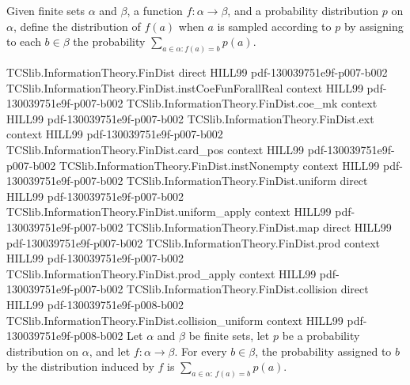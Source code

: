 \begin{definition}
\label{TCSlib.InformationTheory.FinDist.map}
\leanok
{}
Given finite sets $\alpha$ and $\beta$, a function $f:\alpha\to\beta$, and a probability
distribution $p$ on $\alpha$, define the distribution of $f(a)$ when $a$ is sampled
according to $p$ by assigning to each $b\in\beta$ the probability
$\sum_{a\in\alpha:f(a)=b}p(a)$.
\end{definition}

\begin{theorem}
\label{TCSlib.InformationTheory.FinDist.map_apply}
\leanok
\proofstep
  {TCSlib.InformationTheory.FinDist}
  {direct}
  {HILL99}
  {pdf-130039751e9f-p007-b002}
\proofstep
  {TCSlib.InformationTheory.FinDist.instCoeFunForallReal}
  {context}
  {HILL99}
  {pdf-130039751e9f-p007-b002}
\proofstep
  {TCSlib.InformationTheory.FinDist.coe_mk}
  {context}
  {HILL99}
  {pdf-130039751e9f-p007-b002}
\proofstep
  {TCSlib.InformationTheory.FinDist.ext}
  {context}
  {HILL99}
  {pdf-130039751e9f-p007-b002}
\proofstep
  {TCSlib.InformationTheory.FinDist.card_pos}
  {context}
  {HILL99}
  {pdf-130039751e9f-p007-b002}
\proofstep
  {TCSlib.InformationTheory.FinDist.instNonempty}
  {context}
  {HILL99}
  {pdf-130039751e9f-p007-b002}
\proofstep
  {TCSlib.InformationTheory.FinDist.uniform}
  {direct}
  {HILL99}
  {pdf-130039751e9f-p007-b002}
\proofstep
  {TCSlib.InformationTheory.FinDist.uniform_apply}
  {context}
  {HILL99}
  {pdf-130039751e9f-p007-b002}
\proofstep
  {TCSlib.InformationTheory.FinDist.map}
  {direct}
  {HILL99}
  {pdf-130039751e9f-p007-b002}
\proofstep
  {TCSlib.InformationTheory.FinDist.prod}
  {context}
  {HILL99}
  {pdf-130039751e9f-p007-b002}
\proofstep
  {TCSlib.InformationTheory.FinDist.prod_apply}
  {context}
  {HILL99}
  {pdf-130039751e9f-p007-b002}
\proofstep
  {TCSlib.InformationTheory.FinDist.collision}
  {direct}
  {HILL99}
  {pdf-130039751e9f-p008-b002}
\proofstep
  {TCSlib.InformationTheory.FinDist.collision_uniform}
  {context}
  {HILL99}
  {pdf-130039751e9f-p008-b002}
Let $\alpha$ and $\beta$ be finite sets, let $p$ be a probability distribution on
$\alpha$, and let $f\colon\alpha\to\beta$. For every $b\in\beta$, the probability
assigned to $b$ by the distribution induced by $f$ is $\sum_{a\in\alpha:\,f(a)=b}p(a)$.
\end{theorem}


